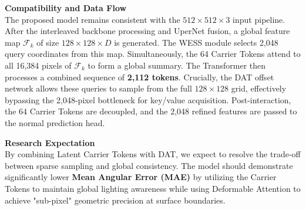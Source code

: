 \documentclass[Main.tex]{subfiles}
\begin{document}
\textbf{Compatibility and Data Flow} \\
The proposed model remains consistent with the $512 \times 512 \times 3$ input pipeline. After the interleaved backbone processing and UperNet fusion, a global feature map $\mathcal{F}_k$ of size \textbf{$128 \times 128 \times D$} is generated. 
The WESS module selects 2,048 query coordinates from this map. Simultaneously, the 64 Carrier Tokens attend to all 16,384 pixels of $\mathcal{F}_k$ to form a global summary. The Transformer then processes a combined sequence of \textbf{2,112 tokens}. Crucially, the DAT offset network allows these queries to sample from the full $128 \times 128$ grid, effectively bypassing the 2,048-pixel bottleneck for key/value acquisition. Post-interaction, the 64 Carrier Tokens are decoupled, and the 2,048 refined features are passed to the normal prediction head.

\textbf{Research Expectation} \\
By combining Latent Carrier Tokens with DAT, we expect to resolve the trade-off between sparse sampling and global consistency. The model should demonstrate significantly lower \textbf{Mean Angular Error (MAE)} by utilizing the Carrier Tokens to maintain global lighting awareness while using Deformable Attention to achieve "sub-pixel" geometric precision at surface boundaries.
\end{document}
